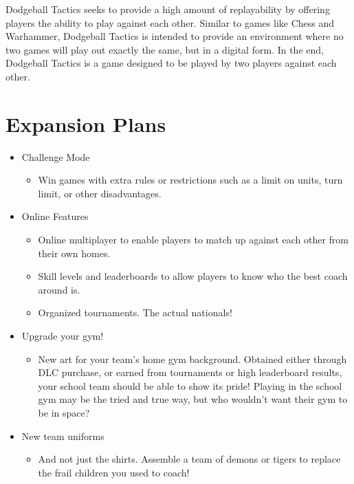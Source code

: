 \documentclass [12pt]{article}
\begin{document}
Dodgeball Tactics seeks to provide a high amount of replayability by offering players the ability to play against each other. Similar to games like Chess and Warhammer, Dodgeball Tactics is intended to provide an environment where no two games will play out exactly the same, but in a digital form. In the end, Dodgeball Tactics is a game designed to be played by two players against each other.

\section*{Expansion Plans}

\begin{itemize}
\item Challenge Mode
	\begin{itemize}
	\item Win games with extra rules or restrictions such as a limit on units, turn limit, or other disadvantages.
	\end{itemize}

\item Online Features
	\begin{itemize}
	\item Online multiplayer to enable players to match up against each other from their own homes.
	\end{itemize}
	\begin{itemize}
	\item Skill levels and leaderboards to allow players to know who the best coach around is.
	\end{itemize}
	\begin{itemize}
	\item Organized tournaments. The actual nationals!
	\end{itemize}

\item Upgrade your gym!
	\begin{itemize}
	\item New art for your team's home gym background. Obtained either through DLC purchase, or earned from tournaments or high leaderboard results, your school team should be able to show its pride! Playing in the school gym may be the tried and true way, but who wouldn't want their gym to be in space?
	\end{itemize}

\item New team uniforms
	\begin{itemize}
	\item And not just the shirts. Assemble a team of demons or tigers to replace the frail children you used to coach!
	\end{itemize}
\end{itemize}
\end{document}
